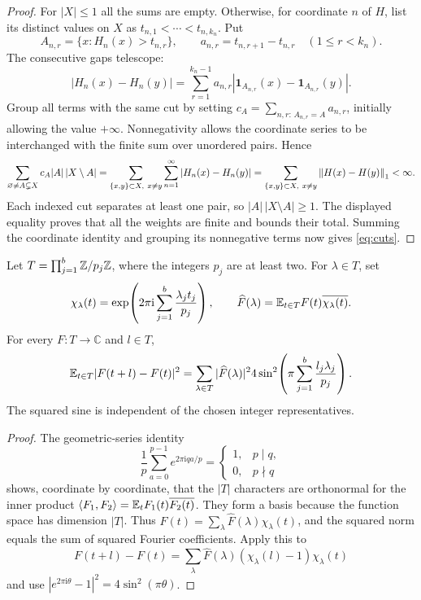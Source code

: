 \begin{proof}
For $|X|\le1$ all the sums are empty. Otherwise, for coordinate $n$ of
$H$, list its distinct values on $X$ as
$t_{n,1}<\cdots<t_{n,k_n}$. Put
\[
 A_{n,r}=\{x:H_n(x)>t_{n,r}\},\qquad
 a_{n,r}=t_{n,r+1}-t_{n,r}\quad(1\le r<k_n).
\]
The consecutive gaps telescope:
\[
 |H_n(x)-H_n(y)|
 =\sum_{r=1}^{k_n-1}a_{n,r}
 |\mathbf1_{A_{n,r}}(x)-\mathbf1_{A_{n,r}}(y)|.
\]
Group all terms with the same cut by setting
$c_A=\sum_{n,r:\,A_{n,r}=A}a_{n,r}$, initially allowing the value
$+\infty$. Nonnegativity allows the coordinate series to be interchanged
with the finite sum over unordered pairs. Hence
\[
 \sum_{\varnothing\ne A\subsetneq X}c_A|A|\,|X\setminus A|
 =\sum_{\{x,y\}\subset X,\ x\ne y}\sum_{n=1}^{\infty}
 |H_n(x)-H_n(y)|
 =\sum_{\{x,y\}\subset X,\ x\ne y}\left\lVert H(x)-H(y)\right\rVert_1<\infty.
\]
Each indexed cut separates at least one pair, so
$|A|\,|X\setminus A|\ge1$. The displayed equality proves that all the
weights are finite and bounds their total. Summing the coordinate
identity and grouping its nonnegative terms now gives \eqref{eq:cuts}.
\end{proof}

\begin{lemma}\label{lem:fourier}
Let $T=\prod_{j=1}^b\mathbb Z/p_j\mathbb Z$, where the integers $p_j$ are at least two.
For $\lambda\in T$, set
\[
 \chi_\lambda(t)=
 \exp\!\left(2\pi\mathrm i\sum_{j=1}^b\frac{\lambda_jt_j}{p_j}\right),
 \qquad
 \widehat F(\lambda)=\mathbb E_{t\in T}F(t)\overline{\chi_\lambda(t)}.
\]
For every $F:T\to\mathbb C$ and $l\in T$,
\begin{equation}\label{eq:fourier-displacement}
 \mathbb E_{t\in T}|F(t+l)-F(t)|^2
 =\sum_{\lambda\in T}|\widehat F(\lambda)|^2
 4\sin^2\!\left(\pi\sum_{j=1}^b\frac{l_j\lambda_j}{p_j}\right).
\end{equation}
The squared sine is independent of the chosen integer representatives.
\end{lemma}

\begin{proof}
The geometric-series identity
\[
 \frac1p\sum_{a=0}^{p-1}e^{2\pi\mathrm iqa/p}
 =\begin{cases}
 1,&p\mid q,\\
 0,&p\nmid q
 \end{cases}
\]
shows, coordinate by coordinate, that the $|T|$ characters are
orthonormal for the inner product
$\langle F_1,F_2\rangle=\mathbb E_tF_1(t)\overline{F_2(t)}$.
They form a basis because the function space has dimension $|T|$.
Thus $F(t)=\sum_\lambda\widehat F(\lambda)\chi_\lambda(t)$, and the
squared norm equals the sum of squared Fourier coefficients. Apply this
to
\[
 F(t+l)-F(t)
 =\sum_\lambda\widehat F(\lambda)
       (\chi_\lambda(l)-1)\chi_\lambda(t)
\]
and use $|e^{2\pi\mathrm i\theta}-1|^2=4\sin^2(\pi\theta)$.
\end{proof}

